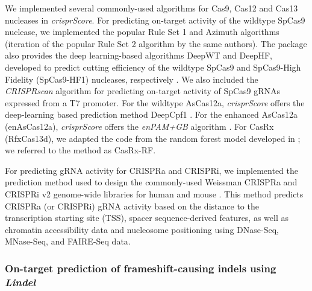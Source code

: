 \documentclass[pdftex,english,10pt]{article}
\begin{document}
We implemented several commonly-used algorithms for Cas9, Cas12 and Cas13 nucleases in \textit{crisprScore}.
For predicting on-target activity of the wildtype SpCas9 nuclease, we implemented the popular Rule Set 1 \citep{doench2014rational} and Azimuth algorithms \citep{azimuth} (iteration of the popular Rule Set 2 algorithm by the same authors). The package also provides the deep learning-based algorithms DeepWT and DeepHF,  developed to predict cutting efficiency of the wildtype SpCas9 and SpCas9-High Fidelity (SpCas9-HF1) nucleases, respectively \citep{deepcas9}. We also included the \textit{CRISPRscan} algorithm \citep{crisprscan} for predicting on-target activity of SpCas9 gRNAs expressed from a T7 promoter. For the wildtype AsCas12a, \textit{crisprScore} offers the deep-learning based prediction method DeepCpf1 \citep{deepcpf1}. For the enhanced AsCas12a (enAsCas12a), \textit{crisprScore} offers the \textit{enPAM+GB} algorithm \citep{enpamgb}. For CasRx (RfxCas13d), we adapted the code from the random forest model developed in \citet{wessels2020massively}; we referred to the method as CasRx-RF.

For predicting gRNA activity for CRISPRa and CRISPRi, we implemented the prediction method used to design the commonly-used Weissman CRISPRa and CRISPRi v2 genome-wide libraries for human and mouse \citep{crispria}.
This method predicts CRISPRa (or CRISPRi) gRNA activity based on the distance to the transcription starting site (TSS), spacer sequence-derived features, as well as chromatin accessibility data and nucleosome positioning using DNase-Seq, MNase-Seq, and FAIRE-Seq data. 

\subsubsection*{On-target prediction of frameshift-causing indels using \textit{Lindel}}
\end{document}
